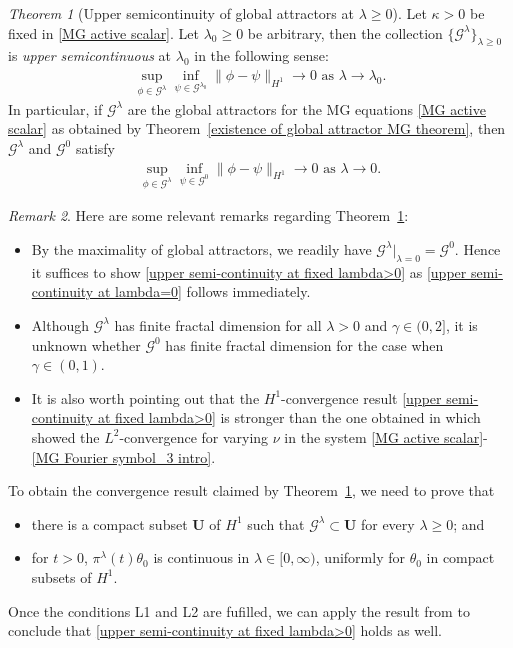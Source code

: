 \documentclass[reqno]{amsart}%
\theoremstyle{definition}
\theoremstyle{remark}
\numberwithin{equation}{section}
\newtheorem{theorem}{Theorem}
\newtheorem{remark}[theorem]{Remark}
\newcommand{\dis}{\displaystyle}
\newcommand{\1}{\mathbf{1}}
\newcommand{\A}{\mathcal{G}^{0}}
\newcommand{\Gg}{\mathcal{G}^{\lambda}}
\newcommand{\Ggo}{\mathcal{G}^{\lambda_{0}}}
\newcommand{\pin}{\pi^{\lambda}}
\newcommand{\U}{\mathbf{U}}
\numberwithin{equation}{section}
\numberwithin{theorem}{section}
\numberwithin{figure}{section}
\begin{document}
\begin{theorem}[Upper semicontinuity of global attractors at $\lambda\ge0$]\label{varying lambda theorem}
Let $\kappa>0$ be fixed in \eqref{MG active scalar}. Let $\lambda_0\ge0$ be arbitrary, then the collection $\dis\{\Gg\}_{\lambda\ge0}$ is {\it upper semicontinuous} at $\lambda_0$ in the following sense: 
\begin{align}\label{upper semi-continuity at fixed lambda>0}
\mbox{$\dis\sup_{\phi\in\Gg}\inf_{\psi\in\Ggo}\|\phi-\psi\|_{H^1}\rightarrow0$ as $\lambda\rightarrow\lambda_0$.}
\end{align}
In particular, if $\Gg$ are the global attractors for the MG equations \eqref{MG active scalar} as obtained by Theorem~\ref{existence of global attractor MG theorem}, then $\Gg$ and $\A$ satisfy
\begin{align}\label{upper semi-continuity at lambda=0}
\mbox{$\dis\sup_{\phi\in\Gg}\inf_{\psi\in\A}\|\phi-\psi\|_{H^1}\rightarrow0$ as $\lambda\rightarrow0$.}
\end{align}
\end{theorem}

\begin{remark}
Here are some relevant remarks regarding Theorem~\ref{varying lambda theorem}:
\begin{itemize}
\item By the maximality of global attractors, we readily have $\Gg|_{\lambda=0}=\A$. Hence it suffices to show \eqref{upper semi-continuity at fixed lambda>0} as \eqref{upper semi-continuity at lambda=0} follows immediately.
\item Although $\Gg$ has finite fractal dimension for all $\lambda>0$ and $\gamma\in(0,2]$, it is unknown whether $\A$ has finite fractal dimension for the case when $\gamma\in(0,1)$.
\item It is also worth pointing out that the $H^1$-convergence result \eqref{upper semi-continuity at fixed lambda>0} is stronger than the one obtained in \cite[Theorem~7.5]{FS21} which showed the $L^2$-convergence for varying $\nu$ in the system \eqref{MG active scalar}-\eqref{MG Fourier symbol_3 intro}.
\end{itemize}
\end{remark}
To obtain the convergence result claimed by Theorem~\ref{varying lambda theorem}, we need to prove that
\begin{itemize}
\item[L1.] there is a compact subset $\U$ of $H^1$ such that $\Gg\subset\U$ for every $\lambda\ge0$; and
\item[L2.] for $t > 0$, $\pin(t)\theta_0$ is continuous in $\lambda\in[0,\infty)$, uniformly for $\theta_0$ in compact subsets of $H^1$.
\end{itemize}
Once the conditions L1 and L2 are fufilled, we can apply the result from \cite{HOR15} to conclude that \eqref{upper semi-continuity at fixed lambda>0} holds as well. 
\end{document}
